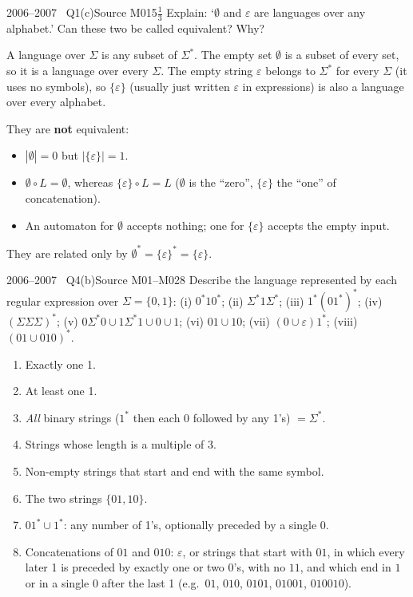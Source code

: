 \documentclass[11pt,a4paper]{article}
\newcommand{\eps}{\varepsilon}
\begin{document}
\begin{question}{2006--2007 \textbullet\ Q1(c)}{Source M01}{5$\tfrac13$}
Explain: `$\emptyset$ and $\eps$ are languages over any alphabet.' Can these two be called equivalent? Why?
\end{question}
\begin{solution}
A language over $\Sigma$ is any subset of $\Sigma^*$. The empty set $\emptyset$ is a subset of every set, so it is a language over every $\Sigma$. The empty string $\eps$ belongs to $\Sigma^*$ for every $\Sigma$ (it uses no symbols), so $\{\eps\}$ (usually just written $\eps$ in expressions) is also a language over every alphabet.

They are \textbf{not} equivalent:
\begin{itemize}
\item $|\emptyset|=0$ but $|\{\eps\}|=1$.
\item $\emptyset\circ L=\emptyset$, whereas $\{\eps\}\circ L=L$ ($\emptyset$ is the ``zero'', $\{\eps\}$ the ``one'' of concatenation).
\item An automaton for $\emptyset$ accepts nothing; one for $\{\eps\}$ accepts the empty input.
\end{itemize}
They are related only by $\emptyset^*=\{\eps\}^*=\{\eps\}$.
\end{solution}

\begin{question}{2006--2007 \textbullet\ Q4(b)}{Source M01--M02}{8}
Describe the language represented by each regular expression over $\Sigma=\{0,1\}$:
(i) $0^*10^*$; (ii) $\Sigma^*1\Sigma^*$; (iii) $1^*(01^*)^*$; (iv) $(\Sigma\Sigma\Sigma)^*$; (v) $0\Sigma^*0\cup1\Sigma^*1\cup0\cup1$; (vi) $01\cup10$; (vii) $(0\cup\eps)1^*$; (viii) $(01\cup010)^*$.
\end{question}
\begin{solution}
\begin{enumerate}
\item Exactly one 1.
\item At least one 1.
\item \emph{All} binary strings ($1^*$ then each 0 followed by any 1's) $=\Sigma^*$.
\item Strings whose length is a multiple of 3.
\item Non-empty strings that start and end with the same symbol.
\item The two strings $\{01,10\}$.
\item $01^*\cup1^*$: any number of 1's, optionally preceded by a single 0.
\item Concatenations of $01$ and $010$: $\eps$, or strings that start with $01$, in which every later 1 is preceded by exactly one or two 0's, with no $11$, and which end in $1$ or in a single $0$ after the last 1 (e.g.\ $01$, $010$, $0101$, $01001$, $010010$).
\end{enumerate}
\end{solution}
\end{document}
